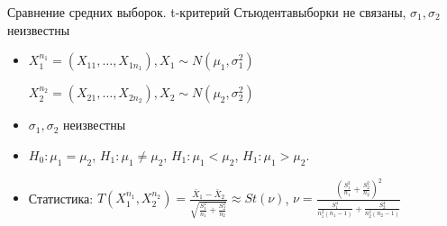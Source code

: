 \documentclass[11pt,pdf,utf8,hyperref={unicode},aspectratio=169]{beamer}
\begin{document}
\begin{frame}[label=ttest2u]{\hyperlink{onesample}{} Сравнение средних выборок. t-критерий Стьюдента}{выборки не связаны, $\sigma_1, \sigma_2$ неизвестны}


    \begin{itemize}
        \item {}

        $X_1^{n_1}=\left(X_{11},\ldots,X_{1n_1}\right), X_{1} \sim N\left(\mu_1, \sigma_1^2\right)$

        $X_2^{n_2}=\left(X_{21},\ldots,X_{2n_2}\right), X_{2} \sim N\left(\mu_2, \sigma_2^2\right)$
        \item $\sigma_1, \sigma_2$ неизвестны
        \item  $H_0\colon \mu_1=\mu_2$,\qquad
        $H_1\colon \mu_1 \neq \mu_2$,
        $H_1\colon \mu_1 < \mu_2$,
        $H_1\colon \mu_1  >\mu_2$.
        \item Статистика: \alert{$\displaystyle
        T\left(X_1^{n_1}, X_2^{n_2}\right) = \frac{\bar{X}_1-\bar{X}_2}{\sqrt{\frac{S_1^2}{n_1} + \frac{S_2^2}{n_2}}} \approx St(\nu)$}, \qquad $\nu = \frac{\left( \frac{S_1^2}{n_1} + \frac{S_2^2}{n_2} \right)^2}{ \frac{S_1^4}{n_1^2(n_1-1)} + \frac{S_2^4}{n_2^2(n_2-1)} }$


\end{itemize}
\end{frame}
\end{document}
